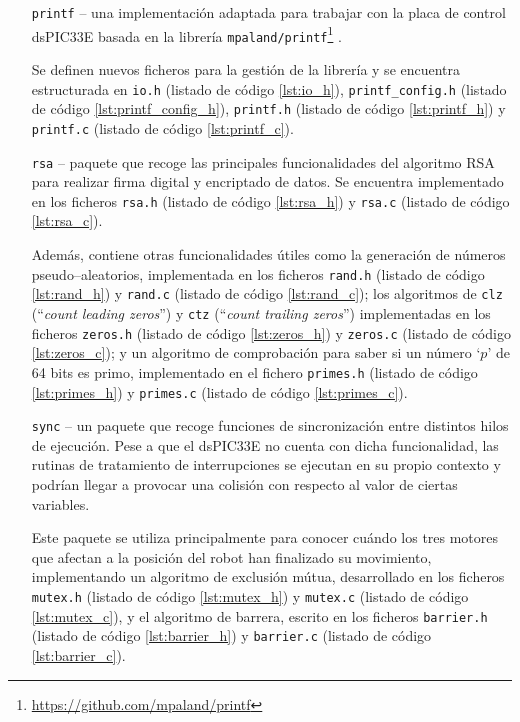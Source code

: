 \begin{itemize}
    \item[\texttt{printf} --] una implementación adaptada para trabajar con la placa
    de control dsPIC33E basada en la librería
    \texttt{mpaland/printf}\footnote{\url{https://github.com/mpaland/printf}}
    \cite{palandMpalandPrintf2020}.

    Se definen nuevos ficheros para la gestión de la librería y se encuentra
    estructurada en \texttt{io.h} (listado de código \ref{lst:io_h}), 
    \texttt{printf\_config.h} (listado de código \ref{lst:printf_config_h}),
    \texttt{printf.h} (listado de código \ref{lst:printf_h}) y \texttt{printf.c}
    (listado de código \ref{lst:printf_c}).

    \item[\texttt{rsa} --] paquete que recoge las principales funcionalidades
    del algoritmo RSA para realizar firma digital y encriptado de datos. Se
    encuentra implementado en los ficheros \texttt{rsa.h} (listado de código
    \ref{lst:rsa_h}) y \texttt{rsa.c} (listado de código \ref{lst:rsa_c}).

    Además, contiene otras funcionalidades útiles como la generación de
    números pseudo--aleatorios, implementada en los ficheros \texttt{rand.h}
    (listado de código \ref{lst:rand_h}) y \texttt{rand.c} (listado de código
    \ref{lst:rand_c}); los algoritmos de \texttt{clz} 
    (``\textit{count leading zeros}'') y \texttt{ctz}
    (``\textit{count trailing zeros}'') implementadas en los ficheros
    \texttt{zeros.h} (listado de código \ref{lst:zeros_h}) y \texttt{zeros.c}
    (listado de código \ref{lst:zeros_c}); y un algoritmo de comprobación 
    para saber si un número `$p$' de 64 bits es primo, implementado en el
    fichero \texttt{primes.h} (listado de código \ref{lst:primes_h}) y
    \texttt{primes.c} (listado de código \ref{lst:primes_c}).

    \item[\texttt{sync} --] un paquete que recoge funciones de sincronización
    entre distintos hilos de ejecución. Pese a que el dsPIC33E no cuenta
    con dicha funcionalidad, las rutinas de tratamiento de interrupciones
    se ejecutan en su propio contexto y podrían llegar a provocar una colisión
    con respecto al valor de ciertas variables.

    Este paquete se utiliza principalmente para conocer cuándo los tres motores
    que afectan a la posición del robot han finalizado su movimiento,
    implementando un algoritmo de exclusión mútua, desarrollado en los ficheros
    \texttt{mutex.h} (listado de código \ref{lst:mutex_h}) y \texttt{mutex.c}
    (listado de código \ref{lst:mutex_c}), y el algoritmo de barrera,
    escrito en los ficheros \texttt{barrier.h} (listado de código
    \ref{lst:barrier_h}) y \texttt{barrier.c} (listado de código \ref{lst:barrier_c}).


\end{itemize}
